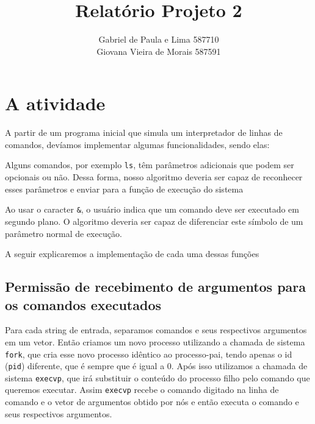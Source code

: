 \documentclass[12pt]{article}
\author{Gabriel de Paula e Lima  587710\\
        Giovana Vieira de Morais  587591}
\title{Relatório Projeto 2}
\begin{document}
\maketitle

\newpage

\section*{A atividade}

A partir de um programa inicial que simula um interpretador de linhas de
comandos, devíamos implementar algumas funcionalidades, sendo elas:

\begin{description}[labelindent=1cm]
    \item[Permissão de argumentos para os comandos
        executados]{Alguns comandos, por exemplo \texttt{ls}, têm parâmetros
        adicionais que podem ser opcionais ou não. Dessa forma, nosso algoritmo
        deveria ser capaz de reconhecer esses parâmetros e enviar para a função
        de execução do sistema}
    \item[Suporte para execução de comandos em segundo plano]{Ao usar o
        caracter \texttt{\&}, o usuário indica que um comando deve ser executado
        em segundo plano. O algoritmo deveria ser capaz de diferenciar este
        símbolo de um parâmetro normal de execução.}
    \item[Redirecionamento de entrada e saída padrão para arquivos]
\end{description}

A seguir explicaremos a implementação de cada uma dessas funções

\subsection*{Permissão de recebimento de argumentos para os comandos executados}

Para cada string de entrada, separamos comandos e seus respectivos argumentos
em um vetor. 
 Então criamos um novo processo utilizando a chamada de sistema \texttt{fork},
 que cria esse novo processo idêntico ao processo-pai, tendo apenas o id
 (\texttt{pid}) diferente, que é sempre que é igual a 0.
 Após isso utilizamos a chamada de sistema \texttt{execvp},
 que irá substituir o conteúdo do processo filho pelo comando que queremos executar.
 Assim \texttt{execvp} recebe o comando digitado na linha de comando e o vetor
 de argumentos obtido por nós e então executa o comando e seus respectivos
 argumentos.
\end{document}
